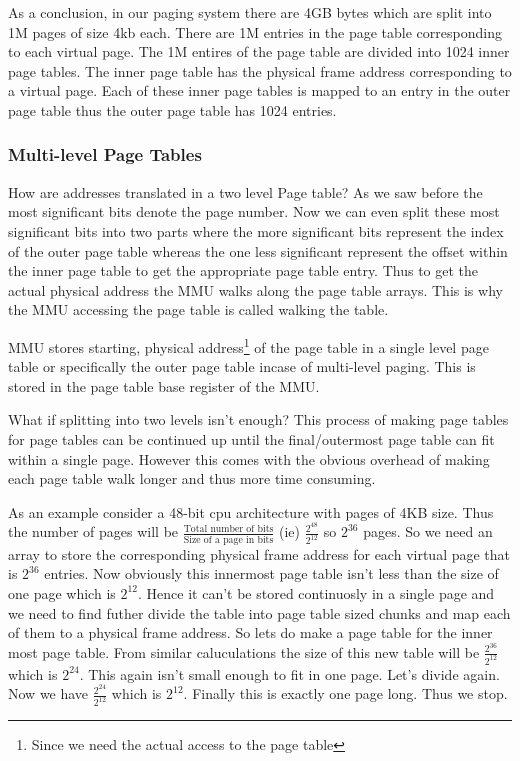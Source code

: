 \documentclass[12pt]{article}
\newcommand{\tbox}[1]{\noindent\fbox{\parbox{\textwidth}{#1}}}
\begin{document}
As a conclusion, in our paging system there are 4GB bytes which are split into 1M pages of size 4kb each. There are 1M entries in the page table corresponding to each virtual page. The 1M entires of the page table are divided into 1024 inner page tables.
The inner page table has the physical frame address corresponding to a virtual page. Each of these inner page tables is mapped to an entry in the outer page table thus the outer page table has 1024 entries.



\subsubsection{Multi-level Page Tables}
How are addresses translated in a two level Page table? As we saw before the most significant bits denote the page number. Now we can even split these most
significant bits into two parts where the more significant bits represent the index of the outer page table whereas the one less significant represent the offset within the inner page table to get the appropriate page table entry. Thus to get the actual 
physical address the MMU walks along the page table arrays. This is why the MMU accessing the page table is called walking the table. 


MMU stores starting, physical address\footnote{Since we need the actual access to the page table} of the page table in a single level page table or specifically the outer page table incase of multi-level paging. 
This is stored in the page table base register of the MMU.

What if splitting into two levels isn't enough? This process of making page tables for page tables can be continued up until the final/outermost page table can fit within a single page. 
However this comes with the obvious overhead of making each page table walk longer and thus more time consuming. 


\noindent\tbox{
    \begin{center}
    \textbf{\Huge Lecture 15}\\
    \end{center}
}


As an example consider a 48-bit cpu architecture with pages of 4KB size. Thus the number of pages will be \(\frac{\text{Total number of bits}}{\text{Size of a page in bits}}\) (ie) \(\frac{2^{48}}{2^{12}}\) so \(2^{36}\) pages. So we need an array to store the corresponding 
physical frame address for each virtual page that is \(2^{36}\) entries. Now obviously this innermost page table isn't less than the size of one page which is \(2^{12}\). Hence it can't be stored continuosly in a single page and we need to find futher divide the table into page table sized chunks and map each of them to a physical frame address.
So lets do make a page table for the inner most page table. From similar caluculations the size of this new table will be \(\frac{2^{36}}{2^{12}}\) which is \(2^{24}\). This again isn't small enough to fit in one page. Let's divide again. Now we have \(\frac{2^{24}}{2^{12}}\) which is \(2^{12}\). Finally this is exactly one page long.
Thus we stop.
\end{document}
